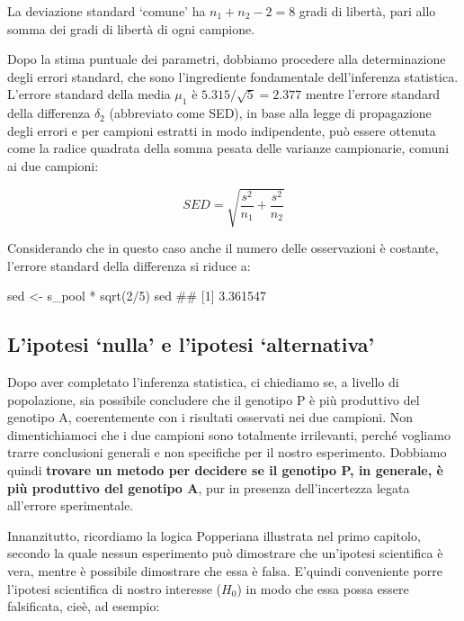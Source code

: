 \documentclass[a4paper,12pt,oneside]{book}
\newenvironment{Shaded}{\begin{snugshade}}{\end{snugshade}}
\newcommand{\DecValTok}[1]{#1}
\newcommand{\SpecialCharTok}[1]{#1}
\newcommand{\DocumentationTok}[1]{#1}
\newcommand{\OtherTok}[1]{#1}
\newcommand{\FunctionTok}[1]{#1}
\newcommand{\NormalTok}[1]{#1}
\begin{document}
La deviazione standard `comune' ha \(n_1 + n_2 - 2 = 8\) gradi di libertà, pari allo somma dei gradi di libertà di ogni campione.

Dopo la stima puntuale dei parametri, dobbiamo procedere alla determinazione degli errori standard, che sono l'ingrediente fondamentale dell'inferenza statistica. L'errore standard della media \(\mu_1\) è \(5.315/\sqrt{5} = 2.377\) mentre l'errore standard della differenza \(\delta_2\) (abbreviato come SED), in base alla legge di propagazione degli errori e per campioni estratti in modo indipendente, può essere ottenuta come la radice quadrata della somma pesata delle varianze campionarie, comuni ai due campioni:

\[SED = \sqrt {\frac{s^2}{ n_1}  + \frac{s^2}{n_2} }\]

Considerando che in questo caso anche il numero delle osservazioni è costante, l'errore standard della differenza si riduce a:

\begin{Shaded}
\begin{Highlighting}[]
\NormalTok{sed }\OtherTok{\textless{}{-}}\NormalTok{ s\_pool }\SpecialCharTok{*} \FunctionTok{sqrt}\NormalTok{(}\DecValTok{2}\SpecialCharTok{/}\DecValTok{5}\NormalTok{)}
\NormalTok{sed}
\DocumentationTok{\#\# [1] 3.361547}
\end{Highlighting}
\end{Shaded}

\hypertarget{lipotesi-nulla-e-lipotesi-alternativa}{%
\subsection{L'ipotesi `nulla' e l'ipotesi `alternativa'}\label{lipotesi-nulla-e-lipotesi-alternativa}}

Dopo aver completato l'inferenza statistica, ci chiediamo se, a livello di popolazione, sia possibile concludere che il genotipo P è più produttivo del genotipo A, coerentemente con i risultati osservati nei due campioni. Non dimentichiamoci che i due campioni sono totalmente irrilevanti, perché vogliamo trarre conclusioni generali e non specifiche per il nostro esperimento. Dobbiamo quindi \textbf{trovare un metodo per decidere se il genotipo P, in generale, è più produttivo del genotipo A}, pur in presenza dell'incertezza legata all'errore sperimentale.

Innanzitutto, ricordiamo la logica Popperiana illustrata nel primo capitolo, secondo la quale nessun esperimento può dimostrare che un'ipotesi scientifica è vera, mentre è possibile dimostrare che essa è falsa. E'quindi conveniente porre l'ipotesi scientifica di nostro interesse (\(H_0\)) in modo che essa possa essere falsificata, cieè, ad esempio:
\end{document}
